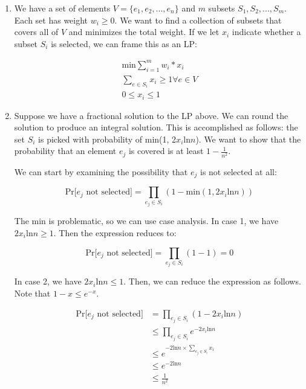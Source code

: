 \documentclass[11pt]{article}
\theoremstyle{definition}
\theoremstyle{case}
\theoremstyle{theorem}
\begin{document}
\begin{enumerate}[label=(\alph*)]

\item We have a set of elements $V = \{e_1, e_2, ..., e_n\}$ and $m$ subsets $S_1, S_2, ..., S_m$. 
Each set has weight $w_i \geq 0$. We want to find a collection of subsets that covers all of $V$ and
minimizes the total weight. If we let $x_i$ indicate whether a subset $S_i$ is selected, we can
frame this as an LP:

\begin{align*}
  \text{min} \sum_{i=1}^m w_i * x_i \\
  \sum_{e \in S_i} x_i \geq 1 \forall e \in V \\
  0 \leq x_i \leq 1   
\end{align*}

\item Suppose we have a fractional solution to the LP above. We can round the solution to
produce an integral solution. This is accomplished as follows: the set $S_i$ is picked with
probability of min(1, 2$x_i$ln$n$). We want to show that the probability that an element $e_j$ is covered
is at least $1 - \frac{1}{n^2}$.

We can start by examining the possibility that $e_j$ is not selected at all:

\[
  \text{Pr[$e_j$ not selected]} = \prod_{e_j \in S_i} ( 1 - \text{min}(1, 2x_i\text{ln}n))
\]

The min is problematic, so we can use case analysis. In case 1, we have $2x_i\text{ln}n \geq 1$. 
Then the expression reduces to: 

\[
  \text{Pr[$e_j$ not selected]} = \prod_{e_j \in S_i} ( 1 - 1 ) = 0 
\]

In case 2, we have $2x_i\text{ln}n \leq 1$. Then, we can reduce the expression as follows.
Note that $1 - x \leq e^{-x}$. 

\begin{align*}
  \text{Pr[$e_j$ not selected]} &= \prod_{e_j \in S_i} ( 1 - 2x_i\text{ln}n ) \\
                            &\leq \prod_{e_j \in S_i} e^{-2x_i\text{ln}n} \\
                            &\leq e^{-2 \text{ln}n \times \sum_{e_j \in S_i} x_i} \\
                            &\leq e^{-2 \text{ln}n} \\
                            &\leq \frac{1}{n^2}
\end{align*}


\end{enumerate}
\end{document}
